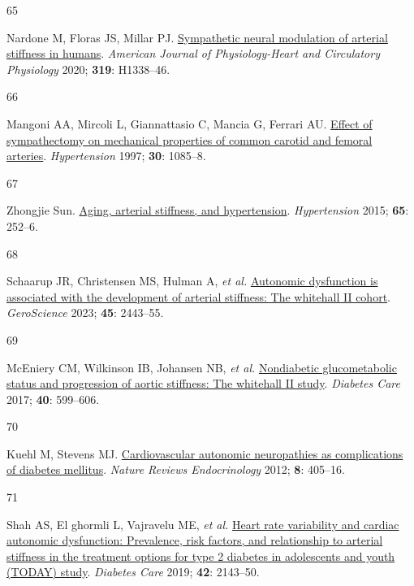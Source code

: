 \documentclass[
  a4paper,
  headsepline=true,
  open=any]{scrbook}
\newlength{\cslhangindent}
\newlength{\csllabelwidth}
\newlength{\cslentryspacingunit} %
\newenvironment{CSLReferences}[2] %
 {%
  \setlength{\parindent}{0pt}
  \ifodd #1
  \let\oldpar\par
  \def\par{\hangindent=\cslhangindent\oldpar}
  \fi
  \setlength{\parskip}{#2\cslentryspacingunit}
 }%
 {}
\newcommand{\CSLLeftMargin}[1]{\parbox[t]{\csllabelwidth}{#1}}
\newcommand{\CSLRightInline}[1]{\parbox[t]{\linewidth - \csllabelwidth}{#1}\break}
\begin{document}
\begin{CSLReferences}{0}{0}
\leavevmode{}%
\CSLLeftMargin{65 }%
\CSLRightInline{Nardone M, Floras JS, Millar PJ.
\href{https://doi.org/10.1152/ajpheart.00734.2020}{Sympathetic neural
modulation of arterial stiffness in humans}. \emph{American Journal of
Physiology-Heart and Circulatory Physiology} 2020; \textbf{319}:
H1338--46.}

\leavevmode{}%
\CSLLeftMargin{66 }%
\CSLRightInline{Mangoni AA, Mircoli L, Giannattasio C, Mancia G, Ferrari
AU. \href{https://doi.org/10.1161/01.HYP.30.5.1085}{Effect of
sympathectomy on mechanical properties of common carotid and femoral
arteries}. \emph{Hypertension} 1997; \textbf{30}: 1085--8.}

\leavevmode{}%
\CSLLeftMargin{67 }%
\CSLRightInline{Zhongjie Sun.
\href{https://doi.org/doi:10.1161/HYPERTENSIONAHA.114.03617}{Aging,
arterial stiffness, and hypertension}. \emph{Hypertension} 2015;
\textbf{65}: 252--6.}

\leavevmode{}%
\CSLLeftMargin{68 }%
\CSLRightInline{Schaarup JR, Christensen MS, Hulman A, \emph{et al.}
\href{https://doi.org/10.1007/s11357-023-00762-0}{Autonomic dysfunction
is associated with the development of arterial stiffness: The whitehall
II cohort}. \emph{GeroScience} 2023; \textbf{45}: 2443--55.}

\leavevmode{}%
\CSLLeftMargin{69 }%
\CSLRightInline{McEniery CM, Wilkinson IB, Johansen NB, \emph{et al.}
\href{https://doi.org/10.2337/dc16-1773}{Nondiabetic glucometabolic
status and progression of aortic stiffness: The whitehall II study}.
\emph{Diabetes Care} 2017; \textbf{40}: 599--606.}

\leavevmode{}%
\CSLLeftMargin{70 }%
\CSLRightInline{Kuehl M, Stevens MJ.
\href{https://doi.org/10.1038/nrendo.2012.21}{Cardiovascular autonomic
neuropathies as complications of diabetes mellitus}. \emph{Nature
Reviews Endocrinology} 2012; \textbf{8}: 405--16.}

\leavevmode{}%
\CSLLeftMargin{71 }%
\CSLRightInline{Shah AS, El ghormli L, Vajravelu ME, \emph{et al.}
\href{https://doi.org/10.2337/dc19-0993}{Heart rate variability and
cardiac autonomic dysfunction: Prevalence, risk factors, and
relationship to arterial stiffness in the treatment options for type 2
diabetes in adolescents and youth (TODAY) study}. \emph{Diabetes Care}
2019; \textbf{42}: 2143--50.}


\end{CSLReferences}
\end{document}
